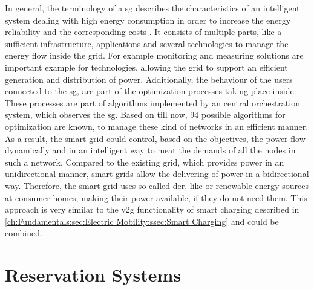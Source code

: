 In general, the terminology of a \acrfull{sg} describes the characteristics of an intelligent system dealing with high energy consumption in order to increase the energy reliability and the corresponding costs \cite{sharma_smart_2020,moreno_escobar_comprehensive_2021}.
It consists of multiple parts, like a sufficient infrastructure, applications and several technologies to manage the energy flow inside the grid.
For example monitoring and measuring solutions are important example for technologies, allowing the grid to support an efficient generation and distribution of power. Additionally, the behaviour of the users connected to the \acrshort{sg}, are part of the optimization processes taking place inside.
These processes are part of algorithms implemented by an central orchestration system, which observes the \acrshort{sg}.
Based on \cite{moreno_escobar_comprehensive_2021} till now, 94 possible algorithms for optimization are known, to manage these kind of networks in an efficient manner.
As a result, the smart grid could control, based on the objectives, the power flow dynamically and in an intelligent way to meat the demands of all the nodes in such a network. 
Compared to the existing grid, which provides power in an unidirectional manner, smart grids allow the delivering of power in a bidirectional way. Therefore, the smart grid uses so called \acrshort{der}, like  or renewable energy sources at consumer homes, making their power available, if they do not need them.
This approach is very similar to the \acrshort{v2g} functionality of smart charging described in \ref{ch:Fundamentals:sec:Electric Mobility:ssec:Smart Charging} and could be combined.


\section{Reservation Systems}
\label{ch:Fundamentals:sec:Reservation Systems}

